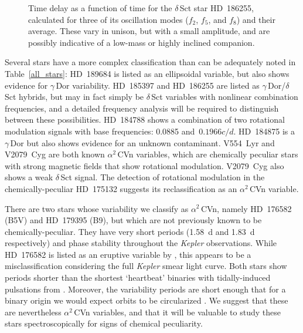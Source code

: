 \documentclass[modern]{aastex62}
\newcommand{\kepler}{\textit{Kepler}\xspace}
\begin{document}
\begin{figure*}

\caption{\label{pm}
Time delay as a function of time for the $\delta$\,Sct star HD~186255, calculated for three of its oscillation modes ($f_2$, $f_5$, and $f_8$) and their average. These vary in unison, but with a small amplitude, and are possibly indicative of a low-mass or highly inclined companion.}
\end{figure*}

Several stars have a more complex classification than can be adequately noted in Table~\ref{all_stars}: HD~189684 is listed as an ellipsoidal variable, but also shows evidence for $\gamma$\,Dor variability. HD~185397 and HD~186255 are listed as $\gamma$\,Dor/$\delta$\,Sct hybrids, but may in fact simply be $\delta$\,Sct variables with nonlinear combination frequencies, and a detailed frequency analysis will be required to distinguish between these possibilities. HD~184788 shows a combination of two rotational modulation signals with base frequencies: 0.0885 and~$0.1966 c/d$. HD~184875 is a $\gamma$\,Dor but also shows evidence for an unknown contaminant. V554~Lyr and V2079~Cyg are both known $\alpha^2$\,CVn variables, which are chemically peculiar stars with strong magnetic fields that show rotational modulation. V2079~Cyg also shows a weak $\delta$\,Sct signal. The detection of rotational modulation in the chemically-peculiar HD~175132 suggests its reclassification as an $\alpha^2$\,CVn variable. 

There are two stars whose variability we classify as $\alpha^2$\,CVn, namely HD~176582 (B5V) and HD~179395 (B9), but which are not previously known to be chemically-peculiar. They have very short periods (1.58~d and 1.83~d respectively) and phase stability throughout the \kepler observations. While HD~176582 is listed as an eruptive variable by \citet{2016ApJ...829...23D}, this appears to be a misclassification considering the full \kepler smear light curve. Both stars show periods shorter than the shortest `heartbeat' binaries with tidally-induced pulsations from \citet{2012ApJ...753...86T}. Moreover, the variability periods are short enough that for a binary origin we would expect orbits to be circularized \citep{2000A&A...354..881D}. We suggest that these are nevertheless $\alpha^2$\,CVn variables, and that it will be valuable to study these stars spectroscopically for signs of chemical peculiarity.
\end{document}

